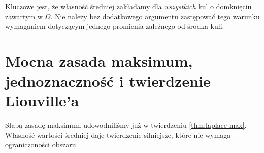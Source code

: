 \begin{uwaga}
Kluczowe jest, że własność średniej zakładamy dla
\emph{wszystkich} kul o domknięciu zawartym w $\Omega$.
Nie należy bez dodatkowego argumentu zastępować tego
warunku wymaganiem dotyczącym jednego promienia
zależnego od środka kuli.
\end{uwaga}

\section{Mocna zasada maksimum, jednoznaczność i twierdzenie Liouville'a}
\label{sec:pde3-max}

Słabą zasadę maksimum udowodniliśmy już w twierdzeniu
\ref{thm:laplace-max}. Własność wartości średniej daje
twierdzenie silniejsze, które nie wymaga ograniczoności obszaru.

